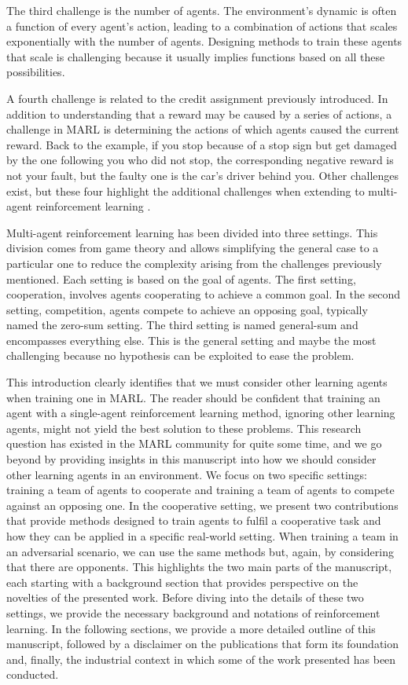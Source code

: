 The third challenge is the number of agents.
The environment's dynamic is often a function of every agent's action, leading to a combination of actions that scales exponentially with the number of agents.
Designing methods to train these agents that scale is challenging because it usually implies functions based on all these possibilities.

A fourth challenge is related to the credit assignment previously introduced.
In addition to understanding that a reward may be caused by a series of actions, a challenge in MARL is determining the actions of which agents caused the current reward.
Back to the example, if you stop because of a stop sign but get damaged by the one following you who did not stop, the corresponding negative reward is not your fault, but the faulty one is the car's driver behind you.
Other challenges exist, but these four highlight the additional challenges when extending to multi-agent reinforcement learning \cite{marl-book}.

Multi-agent reinforcement learning has been divided into three settings.
This division comes from game theory and allows simplifying the general case to a particular one to reduce the complexity arising from the challenges previously mentioned.
Each setting is based on the goal of agents.
The first setting, cooperation, involves agents cooperating to achieve a common goal.
In the second setting, competition, agents compete to achieve an opposing goal, typically named the zero-sum setting.
The third setting is named general-sum and encompasses everything else.
This is the general setting and maybe the most challenging because no hypothesis can be exploited to ease the problem.

This introduction clearly identifies that we must consider other learning agents when training one in MARL.
The reader should be confident that training an agent with a single-agent reinforcement learning method, ignoring other learning agents, might not yield the best solution to these problems.
This research question has existed in the MARL community for quite some time, and we go beyond by providing insights in this manuscript into how we should consider other learning agents in an environment.
We focus on two specific settings: training a team of agents to cooperate and training a team of agents to compete against an opposing one.
In the cooperative setting, we present two contributions that provide methods designed to train agents to fulfil a cooperative task and how they can be applied in a specific real-world setting.
When training a team in an adversarial scenario, we can use the same methods but, again, by considering that there are opponents.
This highlights the two main parts of the manuscript, each starting with a background section that provides perspective on the novelties of the presented work.
Before diving into the details of these two settings, we provide the necessary background and notations of reinforcement learning.
In the following sections, we provide a more detailed outline of this manuscript, followed by a disclaimer on the publications that form its foundation and, finally, the industrial context in which some of the work presented has been conducted.

